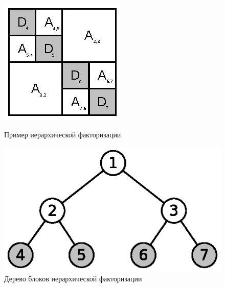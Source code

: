 \begin{figure}[h!]
	\centering
	\begin{minipage}{.45\textwidth}
		\includegraphics[width=.9\linewidth]{img/hssFactor.eps}
		\caption{Пример иерархической факторизации\label{hssFactor}}
	\end{minipage}
	\hfill
	\begin{minipage}{.45\textwidth}
		\includegraphics[width=.9\linewidth]{img/hssTree.eps}
		\caption{Дерево блоков иерархической факторизации\label{hssTree}}
	\end{minipage}
\end{figure}


